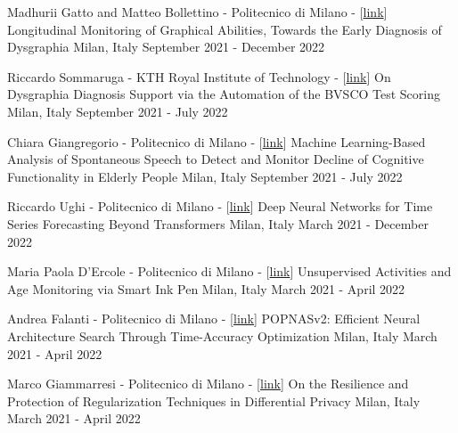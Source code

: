 \begin{cventries}
    \vspace{-10pt}
    \cventry
    {Madhurii Gatto and Matteo Bollettino - Politecnico di Milano - [\href{https://www.politesi.polimi.it/handle/10589/197825}{link}]} %
    {Longitudinal Monitoring of Graphical Abilities, Towards the Early Diagnosis of Dysgraphia} %
    {Milan, Italy} %
    {September 2021 - December 2022} %
    {}

    \vspace{-10pt}
    \cventry
    {Riccardo Sommaruga - KTH Royal Institute of Technology - [\href{https://www.diva-portal.org/smash/get/diva2:1711449/FULLTEXT01.pdf}{link}]} %
    {On Dysgraphia Diagnosis Support via the Automation of the BVSCO Test Scoring} %
    {Milan, Italy} %
    {September 2021 - July 2022} %
    {}

    \vspace{-10pt}
    \cventry
    {Chiara Giangregorio - Politecnico di Milano - [\href{https://www.politesi.polimi.it/handle/10589/189053}{link}]} %
    {Machine Learning-Based Analysis of Spontaneous Speech to Detect and Monitor Decline of Cognitive Functionality in Elderly People} %
    {Milan, Italy} %
    {September 2021 - July 2022} %
    {}

    \vspace{-10pt}
    \cventry
    {Riccardo Ughi - Politecnico di Milano - [\href{https://www.politesi.polimi.it/handle/10589/197272}{link}]} %
    {Deep Neural Networks for Time Series Forecasting Beyond Transformers} %
    {Milan, Italy} %
    {March 2021 - December 2022} %
    {}

    \vspace{-10pt}
    \cventry
    {Maria Paola D'Ercole - Politecnico di Milano - [\href{https://www.politesi.polimi.it/handle/10589/186950}{link}]} %
    {Unsupervised Activities and Age Monitoring via Smart Ink Pen} %
    {Milan, Italy} %
    {March 2021 - April 2022} %
    {}

    \vspace{-10pt}
    \cventry
    {Andrea Falanti - Politecnico di Milano - [\href{https://www.politesi.polimi.it/handle/10589/186258}{link}]} %
    {POPNASv2: Efficient Neural Architecture Search Through Time-Accuracy Optimization} %
    {Milan, Italy} %
    {March 2021 - April 2022} %
    {}

    \vspace{-10pt}
    \cventry
    {Marco Giammarresi - Politecnico di Milano - [\href{https://www.politesi.polimi.it/handle/10589/187045}{link}]} %
    {On the Resilience and Protection of Regularization Techniques in Differential Privacy} %
    {Milan, Italy} %
    {March 2021 - April 2022} %
    {}
    
\end{cventries}